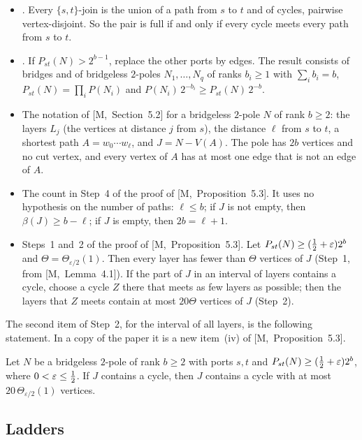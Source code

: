 \documentclass[11pt]{article}
\newcommand{\M}[1]{[M,~#1]}
\begin{document}
\begin{itemize}[leftmargin=1.2em]
\item \M{Lemma~5.1}. Every $\{s,t\}$-join is the union of a path from $s$ to $t$ and of cycles,
pairwise vertex-disjoint. So the pair is full if and only if every cycle meets every path from
$s$ to $t$.
\item \M{Lemma~5.2}. If $P_{st}(N)>2^{b-1}$, replace the other ports by edges. The result
consists of bridges and of bridgeless $2$-poles $N_1,\dots,N_q$ of ranks $b_i\ge1$ with
$\sum_ib_i=b$, $P_{st}(N)=\prod_iP(N_i)$ and $P(N_i)\,2^{-b_i}\ge P_{st}(N)\,2^{-b}$.
\item The notation of \M{Section~5.2} for a bridgeless $2$-pole $N$ of rank $b\ge2$: the layers
$L_j$ (the vertices at distance $j$ from $s$), the distance $\ell$ from $s$ to $t$, a shortest
path $A=w_0\cdots w_\ell$, and $J=N-V(A)$. The pole has $2b$ vertices and no cut vertex, and
every vertex of $A$ has at most one edge that is not an edge of $A$.
\item The count in Step~4 of the proof of \M{Proposition~5.3}. It uses no hypothesis on the
number of paths: $\ell\le b$; if $J$ is not empty, then $\beta(J)\ge b-\ell$; if $J$ is empty,
then $2b=\ell+1$.
\item Steps~1 and~2 of the proof of \M{Proposition~5.3}. Let
$P_{st}(N)\ge(\tfrac12+\varepsilon)2^{b}$ and $\Theta=\Theta_{\varepsilon/2}(1)$. Then every layer
has fewer than $\Theta$ vertices of $J$ (Step~1, from \M{Lemma~4.1}). If the part of $J$ in an
interval of layers contains a cycle, choose a cycle $Z$ there that meets as few layers as
possible; then the layers that $Z$ meets contain at most $20\Theta$ vertices of $J$ (Step~2).
\end{itemize}

The second item of Step~2, for the interval of all layers, is the following statement. In a copy
of the paper it is a new item~(iv) of \M{Proposition~5.3}.

\begin{lemma}\label{lem:short}
Let $N$ be a bridgeless $2$-pole of rank $b\ge2$ with ports $s,t$ and
$P_{st}(N)\ge(\tfrac12+\varepsilon)2^{b}$, where $0<\varepsilon\le\tfrac12$. If $J$ contains a cycle,
then $J$ contains a cycle with at most $20\,\Theta_{\varepsilon/2}(1)$ vertices.
\end{lemma}

\subsection{Ladders}
\end{document}
